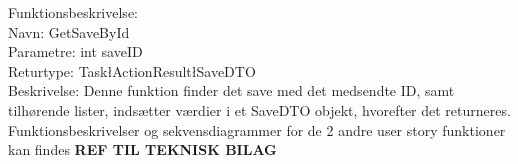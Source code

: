 Funktionsbeskrivelse:\\
Navn: GetSaveById \\
Parametre: int saveID\\
Returtype: Task\l ActionResult\l SaveDTO\g\g\\
Beskrivelse: Denne funktion finder det save med det medsendte ID, samt tilhørende lister, indsætter værdier i et SaveDTO objekt, hvorefter det returneres.\\

Funktionsbeskrivelser og sekvensdiagrammer for de 2 andre user story funktioner kan findes \textbf{REF TIL TEKNISK BILAG}